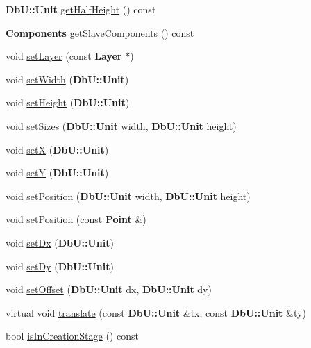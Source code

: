 \begin{DoxyCompactItemize}
{\bf Db\-U\-::\-Unit} \hyperlink{classKatabatic_1_1AutoContact_a68048c464a03e8bbc9ae9ec74b037561}{get\-Half\-Height} () const 
\item 
{\bf Components} \hyperlink{classKatabatic_1_1AutoContact_a5e6d3b7991ce74215e3e0a0ae6c07645}{get\-Slave\-Components} () const 
\item 
void \hyperlink{classKatabatic_1_1AutoContact_aad4271c35e0162c8a4d034dca07f5a4b}{set\-Layer} (const {\bf Layer} $\ast$)
\item 
void \hyperlink{classKatabatic_1_1AutoContact_a9a0ec0a0ac85f23cfad6c069ea8dade7}{set\-Width} ({\bf Db\-U\-::\-Unit})
\item 
void \hyperlink{classKatabatic_1_1AutoContact_a106f372cee0916ebb6544627e47bb58d}{set\-Height} ({\bf Db\-U\-::\-Unit})
\item 
void \hyperlink{classKatabatic_1_1AutoContact_a0284fcec9bd41b26648e7bef3d4f1952}{set\-Sizes} ({\bf Db\-U\-::\-Unit} width, {\bf Db\-U\-::\-Unit} height)
\item 
void \hyperlink{classKatabatic_1_1AutoContact_a154f993d0262c92bfc0dc95154faf794}{set\-X} ({\bf Db\-U\-::\-Unit})
\item 
void \hyperlink{classKatabatic_1_1AutoContact_ac862ce450a533f0544d2168b132ba165}{set\-Y} ({\bf Db\-U\-::\-Unit})
\item 
void \hyperlink{classKatabatic_1_1AutoContact_a12d3bfdce07580db21b17cf87f912cc3}{set\-Position} ({\bf Db\-U\-::\-Unit} width, {\bf Db\-U\-::\-Unit} height)
\item 
void \hyperlink{classKatabatic_1_1AutoContact_a52707afec84391e898e01c75b2713d32}{set\-Position} (const {\bf Point} \&)
\item 
void \hyperlink{classKatabatic_1_1AutoContact_a2c83ac6a03bbac090a8ab120d62c6e44}{set\-Dx} ({\bf Db\-U\-::\-Unit})
\item 
void \hyperlink{classKatabatic_1_1AutoContact_a123478e15e2544598851d0e907212841}{set\-Dy} ({\bf Db\-U\-::\-Unit})
\item 
void \hyperlink{classKatabatic_1_1AutoContact_a9881d5e969669b641c5de4f4d94e5d15}{set\-Offset} ({\bf Db\-U\-::\-Unit} dx, {\bf Db\-U\-::\-Unit} dy)
\item 
virtual void \hyperlink{classKatabatic_1_1AutoContact_a9161f1e2832e5e141a13863223322aa5}{translate} (const {\bf Db\-U\-::\-Unit} \&tx, const {\bf Db\-U\-::\-Unit} \&ty)
\item 
bool \hyperlink{classKatabatic_1_1AutoContact_a8a8f27ca267d07ae56abff162a3b3ae0}{is\-In\-Creation\-Stage} () const 
\item 

\end{DoxyCompactItemize}
